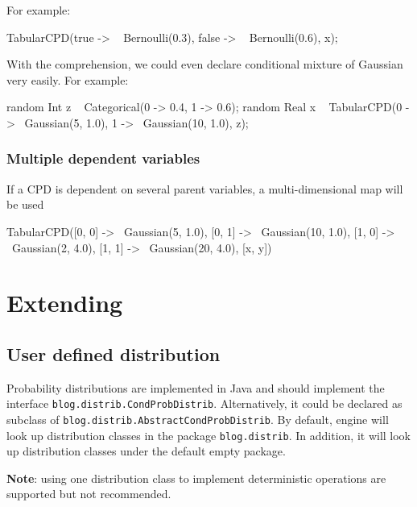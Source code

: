 \documentclass[12pt]{article}
\begin{document}
For example:
\begin{blogcode}
TabularCPD({true -> ~ Bernoulli(0.3), 
            false -> ~ Bernoulli(0.6)}, x);
\end{blogcode}

With the comprehension, we could even declare conditional mixture of Gaussian very easily. For example:
\begin{blogcode}
random Int z ~ Categorical({0 -> 0.4, 1 -> 0.6});
random Real x ~ TabularCPD({0 -> ~Gaussian(5, 1.0), 
                 1 -> ~Gaussian(10, 1.0)}, z);
\end{blogcode}

\subsubsection{Multiple dependent variables}
If a CPD is dependent on several parent variables, a multi-dimensional map will be used
\begin{blogcode}
TabularCPD({[0, 0] -> ~Gaussian(5, 1.0), 
            [0, 1] -> ~Gaussian(10, 1.0),
            [1, 0] -> ~Gaussian(2, 4.0),
            [1, 1] -> ~Gaussian(20, 4.0)}, [x, y])
\end{blogcode}



\section{Extending \bl}
\subsection{User defined distribution}
Probability distributions are implemented in Java and should implement the
 interface \verb|blog.distrib.CondProbDistrib|. Alternatively, it could be declared as subclass of \verb|blog.distrib.AbstractCondProbDistrib|. 
By default, \bl engine will look up distribution classes in the package \verb|blog.distrib|. In addition, it will look up distribution classes under the default empty package. 

{\bf Note}: using one distribution class to implement deterministic operations are supported but not recommended. 
\end{document}

